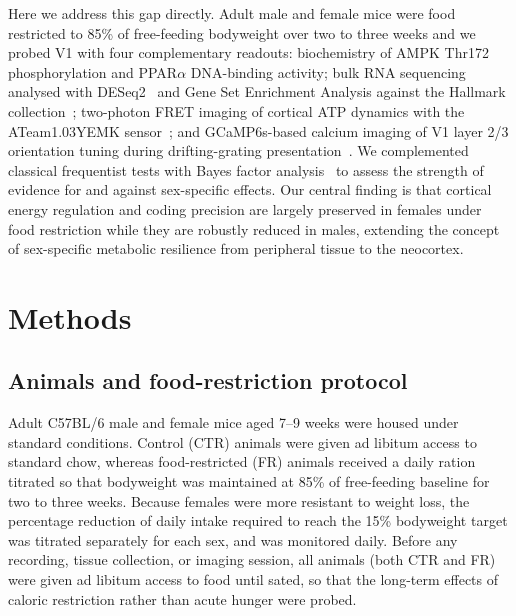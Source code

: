 \documentclass[11pt]{article}
\begin{document}
Here we address this gap directly. Adult male and female mice were food restricted to 85\% of free-feeding bodyweight over two to three weeks and we probed V1 with four complementary readouts: biochemistry of AMPK Thr172 phosphorylation and PPAR$\alpha$ DNA-binding activity; bulk RNA sequencing analysed with DESeq2~\citep{love2014moderated} and Gene Set Enrichment Analysis against the Hallmark collection~\citep{subramanian2005gsea}; two-photon FRET imaging of cortical ATP dynamics with the ATeam1.03YEMK sensor~\citep{imamura2009visualization, tsuyama2013ateam, ando2012visualization, kishikawa2011ateam}; and GCaMP6s-based calcium imaging of V1 layer 2/3 orientation tuning during drifting-grating presentation~\citep{mcclure2019puretones, petousakis2023apical}. We complemented classical frequentist tests with Bayes factor analysis~\citep{sekulovski2024bayes} to assess the strength of evidence for and against sex-specific effects. Our central finding is that cortical energy regulation and coding precision are largely preserved in females under food restriction while they are robustly reduced in males, extending the concept of sex-specific metabolic resilience from peripheral tissue to the neocortex.

\section{Methods}

\subsection{Animals and food-restriction protocol}
Adult C57BL/6 male and female mice aged 7--9 weeks were housed under standard conditions. Control (CTR) animals were given ad libitum access to standard chow, whereas food-restricted (FR) animals received a daily ration titrated so that bodyweight was maintained at 85\% of free-feeding baseline for two to three weeks. Because females were more resistant to weight loss, the percentage reduction of daily intake required to reach the 15\% bodyweight target was titrated separately for each sex, and was monitored daily. Before any recording, tissue collection, or imaging session, all animals (both CTR and FR) were given ad libitum access to food until sated, so that the long-term effects of caloric restriction rather than acute hunger were probed.
\end{document}
